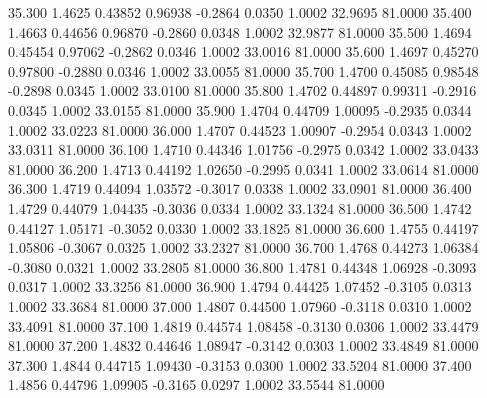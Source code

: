   35.300   1.4625   0.43852   0.96938  -0.2864   0.0350   1.0002  32.9695  81.0000
  35.400   1.4663   0.44656   0.96870  -0.2860   0.0348   1.0002  32.9877  81.0000
  35.500   1.4694   0.45454   0.97062  -0.2862   0.0346   1.0002  33.0016  81.0000
  35.600   1.4697   0.45270   0.97800  -0.2880   0.0346   1.0002  33.0055  81.0000
  35.700   1.4700   0.45085   0.98548  -0.2898   0.0345   1.0002  33.0100  81.0000
  35.800   1.4702   0.44897   0.99311  -0.2916   0.0345   1.0002  33.0155  81.0000
  35.900   1.4704   0.44709   1.00095  -0.2935   0.0344   1.0002  33.0223  81.0000
  36.000   1.4707   0.44523   1.00907  -0.2954   0.0343   1.0002  33.0311  81.0000
  36.100   1.4710   0.44346   1.01756  -0.2975   0.0342   1.0002  33.0433  81.0000
  36.200   1.4713   0.44192   1.02650  -0.2995   0.0341   1.0002  33.0614  81.0000
  36.300   1.4719   0.44094   1.03572  -0.3017   0.0338   1.0002  33.0901  81.0000
  36.400   1.4729   0.44079   1.04435  -0.3036   0.0334   1.0002  33.1324  81.0000
  36.500   1.4742   0.44127   1.05171  -0.3052   0.0330   1.0002  33.1825  81.0000
  36.600   1.4755   0.44197   1.05806  -0.3067   0.0325   1.0002  33.2327  81.0000
  36.700   1.4768   0.44273   1.06384  -0.3080   0.0321   1.0002  33.2805  81.0000
  36.800   1.4781   0.44348   1.06928  -0.3093   0.0317   1.0002  33.3256  81.0000
  36.900   1.4794   0.44425   1.07452  -0.3105   0.0313   1.0002  33.3684  81.0000
  37.000   1.4807   0.44500   1.07960  -0.3118   0.0310   1.0002  33.4091  81.0000
  37.100   1.4819   0.44574   1.08458  -0.3130   0.0306   1.0002  33.4479  81.0000
  37.200   1.4832   0.44646   1.08947  -0.3142   0.0303   1.0002  33.4849  81.0000
  37.300   1.4844   0.44715   1.09430  -0.3153   0.0300   1.0002  33.5204  81.0000
  37.400   1.4856   0.44796   1.09905  -0.3165   0.0297   1.0002  33.5544  81.0000
